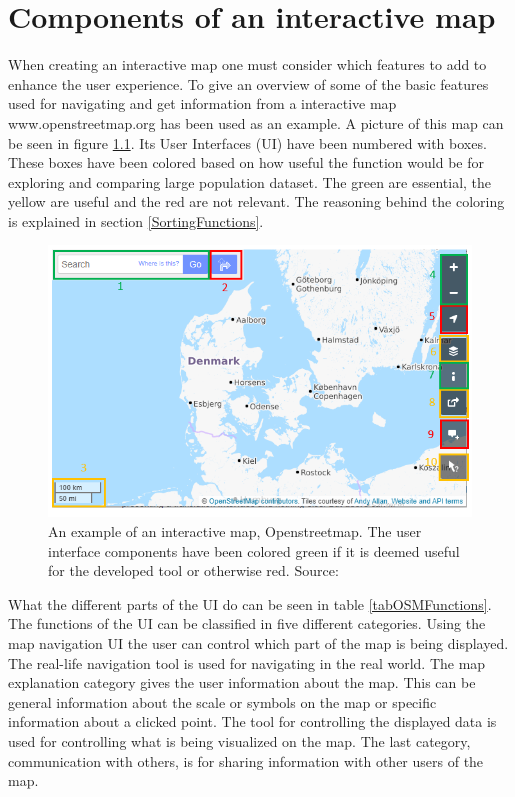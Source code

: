 \chapter{Components of an interactive map}\label{CInteractiveMap}
When creating an interactive map one must consider which features to add to enhance the user experience. To give an overview of some of the basic features used for navigating and get information from a interactive map www.openstreetmap.org has been used as an example. \citep{OpenStreetMap} A picture of this map can be seen in figure \ref{InteractiveMap}. Its User Interfaces (UI) have been numbered with boxes. These boxes have been colored based on how useful the function would be for exploring and comparing large population dataset. The green are essential, the yellow are useful and the red are not relevant. The reasoning behind the coloring is explained in section \ref{SortingFunctions}.


\begin{figure} [H]
	\centering
	\includegraphics[width=.8\textwidth]{Pictures/InteractiveMap}
	\caption{An example of an interactive map, Openstreetmap. The user interface components have been colored green if it is deemed useful for the developed tool or otherwise red. Source: \citep{OpenStreetMap}}
	\label{InteractiveMap}
\end{figure}



What the different parts of the UI do can be seen in table \ref{tabOSMFunctions}. The functions of the UI can be classified in five different categories. Using the map navigation UI the user can control which part of the map is being displayed.
The real-life navigation tool is used for navigating in the real world. 
The map explanation category gives the user information about the map. This can be general information about the scale or symbols on the map or specific information about a clicked point. 
The tool for controlling the displayed data is used for controlling what is being visualized on the map. The last category, communication with others, is for sharing information with other users of the map. 

